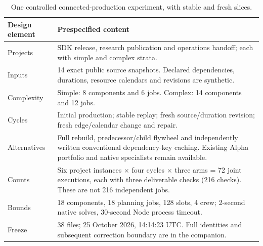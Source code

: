 \begin{table}[H]\small
\begin{tabularx}{\linewidth}{p{.24\linewidth}X}\toprule Design element & Prespecified content \\\midrule
Projects & SDK release, research publication and operations handoff; each with simple and complex strata. \\
Inputs & 14 exact public source snapshots. Declared dependencies, durations, resource calendars and revisions are synthetic. \\
Complexity & Simple: 8 components and 6 jobs. Complex: 14 components and 12 jobs. \\
Cycles & Initial production; stable replay; fresh source/duration revision; fresh edge/calendar change and repair. \\
Alternatives & Full rebuild, predecessor/child flywheel and independently written conventional dependency-key caching. Existing Alpha portfolio and native specialists remain available. \\
Counts & Six project instances $\times$ four cycles $\times$ three arms = 72 joint executions, each with three deliverable checks (216 checks). These are not 216 independent jobs. \\
Bounds & 18 components, 18 planning jobs, 128 slots, 4 crew; 2-second native solves, 30-second Node process timeout. \\
Freeze & 38 files; 25 October 2026, 14:14:23 UTC. Full identities and subsequent correction boundary are in the companion. \\\bottomrule\end{tabularx}
\caption{One controlled connected-production experiment, with stable and fresh slices.}
\end{table}
